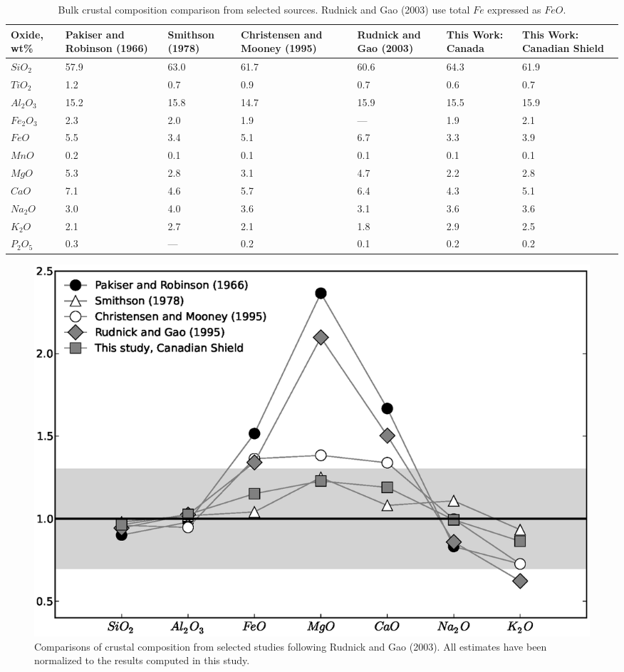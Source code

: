 \documentclass[msc,oneside]{ubcthesis}
\begin{document}
\begin{table}
  \begin{tabular}{ p{2cm} p{2cm} p{2cm} p{2cm} p{2cm} p{2cm} p{2cm}}
    \hline
    Oxide, wt\% & Pakiser and Robinson (1966) & Smithson (1978) & Christensen and Mooney (1995) & Rudnick and Gao (2003) & This Work: Canada & This Work: Canadian Shield\\
    \hline
    $SiO_2$ & 57.9 & 63.0 & 61.7 & 60.6 & 64.3 & 61.9 \\
    $TiO_2$ & 1.2 & 0.7 & 0.9 & 0.7 & 0.6 & 0.7 \\
    $Al_2O_3$ & 15.2 & 15.8 & 14.7 & 15.9 & 15.5 & 15.9 \\
    $Fe_2O_3$ & 2.3 & 2.0 & 1.9 & --- & 1.9 & 2.1 \\
    $FeO$ & 5.5 & 3.4 & 5.1 & 6.7 & 3.3 & 3.9 \\
    $MnO$ & 0.2 & 0.1 & 0.1 & 0.1 & 0.1 & 0.1 \\
    $MgO$ & 5.3 & 2.8 & 3.1 & 4.7 & 2.2 & 2.8 \\
    $CaO$ & 7.1 & 4.6 & 5.7 & 6.4 & 4.3 & 5.1 \\
    $Na_2O$ & 3.0 & 4.0 & 3.6 & 3.1 & 3.6 & 3.6 \\
    $K_2O$ & 2.1 & 2.7 & 2.1 & 1.8 & 2.9 & 2.5 \\
    $P_2O_5$ & 0.3 & --- & 0.2 & 0.1 & 0.2 & 0.2 \\
    \hline
  \end{tabular}
  \caption[Bulk crustal composition comparison]{Bulk crustal composition comparison from selected sources. Rudnick and Gao (2003) use total $Fe$ expressed as $FeO$.}
\label{table:composition}

\end{table}

\begin{figure}
  \centering
  \includegraphics[width=\textwidth]{composition.eps}
  \caption[Normalized crustal composition comparison]{Comparisons of crustal composition from selected studies following Rudnick and Gao (2003). All estimates have been normalized to the results computed in this study.}
  \label{fig:composition}
\end{figure}
\end{document}
